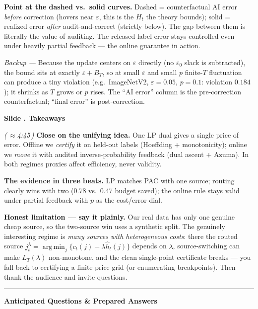 \documentclass[11pt]{article}
\newcommand{\eps}{\varepsilon}
\newcommand{\argmin}{\operatorname*{arg\,min}}
\newcommand{\hath}{\widehat h}
\newcommand{\cue}[1]{\textcolor{blue!60!black}{\textbf{#1}}}
\newcommand{\timecue}[1]{\hfill{\small\itshape(\,$\approx$#1\,)}}
\newcommand{\backup}[1]{{\small\textcolor{black!72}{\textit{Backup --- } #1}}}
\renewcommand{\thesection}{\arabic{section}}
\renewcommand{\section}[1]{%
  \refstepcounter{section}%
  \par\vspace{0.6\baselineskip}%
  {\large\bfseries\color{blue!45!black}Slide \thesection. #1}\par
  \vspace{0.2\baselineskip}}
\begin{document}
\cue{Point at the dashed vs.\ solid curves.} Dashed = counterfactual AI error
\emph{before} correction (hovers near $\eps$, this is the $H_t$ the theory
bounds); solid = realized error \emph{after} audit-and-correct (strictly below).
The gap between them is literally the value of auditing. The released-label error
stays controlled even under heavily partial feedback --- the online guarantee in
action.

\backup{Because the update centers on $\eps$ directly (no $\eps_0$ slack is
subtracted), the bound sits at exactly $\eps+B_T$, so at small $\eps$ and small
$p$ finite-$T$ fluctuation can produce a tiny violation (e.g.\ ImageNetV2,
$\eps=0.05$, $p=0.1$: violation $0.184$); it shrinks as $T$ grows or $p$ rises.
The ``AI error'' column is the pre-correction counterfactual; ``final error'' is
post-correction.}

\section{Takeaways}
\timecue{4:45}
\cue{Close on the unifying idea.} One LP dual gives a single price of error.
Offline we \emph{certify} it on held-out labels (Hoeffding + monotonicity);
online we \emph{move} it with audited inverse-probability feedback (dual ascent +
Azuma). In both regimes proxies affect efficiency, never validity.

\cue{The evidence in three beats.} LP matches PAC with one source; routing
clearly wins with two (0.78 vs.\ 0.47 budget saved); the online rule stays valid
under partial feedback with $p$ as the cost/error dial.

\cue{Honest limitation --- say it plainly.} Our real data has only one genuine
cheap source, so the two-source win uses a synthetic split. The genuinely
interesting regime is \emph{many sources with heterogeneous costs}: there the
routed source $j_t^\lambda=\argmin_j\{c_t(j)+\lambda\hath_t(j)\}$ depends on
$\lambda$, source-switching can make $L_T(\lambda)$ non-monotone, and the clean
single-point certificate breaks --- you fall back to certifying a finite price
grid (or enumerating breakpoints). Then thank the audience and invite questions.

\par\vspace{1.2\baselineskip}
\hrule
\vspace{0.4\baselineskip}
{\Large\bfseries\color{blue!45!black}Anticipated Questions \& Prepared Answers}
\vspace{0.3\baselineskip}
\end{document}
